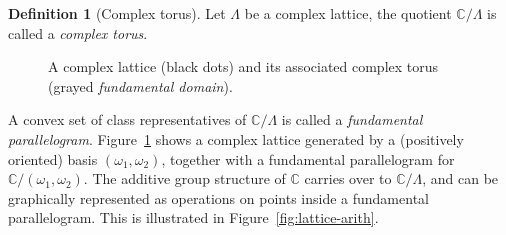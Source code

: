 \documentclass[10pt]{article}
\newcommand{\axes}[4]{
  \clip (#1,#3) rectangle (#2,#4);
  \draw [thin, gray, -latex] (#1,0) -- (#2,0);%
  \draw [thin, gray, -latex] (0,#3) -- (0,#4);%
}
\newcommand{\lattice}[3][2pt]{
  \draw[style=help lines,dashed] (#2-1,#2-1) grid[step=1] (#3+1,#3+1);
  \foreach \x in {#2,...,#3}{
    \foreach \y in {#2,...,#3}{
      \node[draw,circle,inner sep=#1,fill] at (\x,\y) {};
    }
  }
}
\theoremstyle{plain}
\theoremstyle{definition}
\newtheorem{definition}[theorem]{Definition}
\begin{document}
\begin{definition}[Complex torus]
  Let $Λ$ be a complex lattice, the quotient $ℂ/Λ$ is called a
  \emph{complex torus}.
\end{definition}

\begin{figure}
  \centering

  \caption{A complex lattice (black dots) and its associated complex
    torus (grayed \emph{fundamental domain}).}
  \label{fig:lattice}
\end{figure}

A convex set of class representatives of $ℂ/Λ$ is called a
\emph{fundamental parallelogram}. %
Figure~\ref{fig:lattice} shows a complex lattice generated by a
(positively oriented) basis $(ω_1,ω_2)$, together with a fundamental
parallelogram for $ℂ/(ω_1,ω_2)$. %
The additive group structure of $ℂ$ carries over to $ℂ/Λ$, and can be
graphically represented as operations on points inside a fundamental
parallelogram. %
This is illustrated in Figure~\ref{fig:lattice-arith}.
\end{document}
